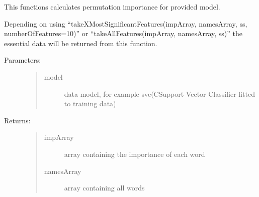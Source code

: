 \documentclass[letterpaper,10pt,english]{sphinxmanual}
\begin{document}
\begin{fulllineitems}
\label{\detokenize{metrics:metrics.permutationImportance}}
\pysigstartsignatures
{}
\pysigstopsignatures
\sphinxAtStartPar
This functions calculates permutation importance for provided model.

\sphinxAtStartPar
Depending on using “takeXMostSignificantFeatures(impArray, namesArray, ss, numberOfFeatures=10)” or
“takeAllFeatures(impArray, namesArray, ss)” the essential data will be returned from this function.
\begin{description}
\item[{Parameters:}] \leavevmode\begin{quote}\begin{description}
\item[{model}] \leavevmode
\sphinxAtStartPar
data model, for example svc(C\sphinxhyphen{}Support Vector Classifier fitted to training data)

\end{description}\end{quote}

\item[{Returns:}] \leavevmode\begin{quote}\begin{description}
\item[{impArray}] \leavevmode
\sphinxAtStartPar
array containing the importance of each word

\item[{namesArray}] \leavevmode
\sphinxAtStartPar
array containing all words

\end{description}\end{quote}

\end{description}

\end{fulllineitems}

\end{document}
